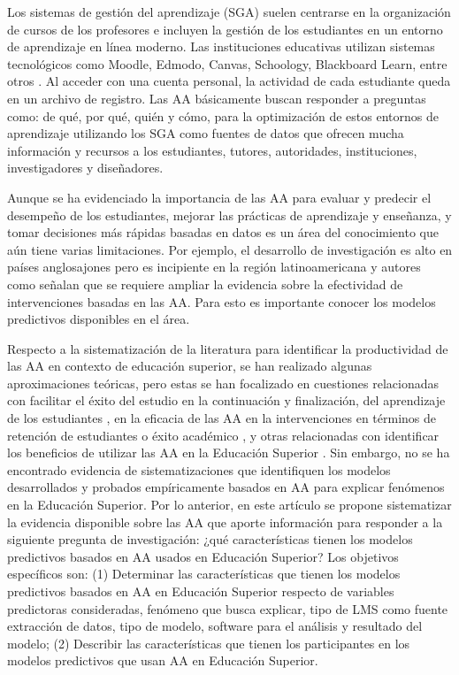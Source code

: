 \documentclass[spanish]{textolivre}
\begin{document}
Los sistemas de gestión del aprendizaje (SGA) suelen centrarse en la organización de cursos de los profesores e incluyen la gestión de los estudiantes en un entorno de aprendizaje en línea moderno. Las instituciones educativas utilizan sistemas tecnológicos como Moodle, Edmodo, Canvas, Schoology, Blackboard Learn, entre otros \cite{zhang2020}. Al acceder con una cuenta personal, la actividad de cada estudiante queda en un archivo de registro. Las AA básicamente buscan responder a preguntas como: de qué, por qué, quién y cómo, para la optimización de estos entornos de aprendizaje utilizando los SGA como fuentes de datos que ofrecen mucha información y recursos a los estudiantes, tutores, autoridades, instituciones, investigadores y diseñadores.

Aunque se ha evidenciado la importancia de las AA para evaluar y predecir el desempeño de los estudiantes, mejorar las prácticas de aprendizaje y enseñanza, y tomar decisiones más rápidas basadas en datos \cite{hooda2020} es un área del conocimiento que aún tiene varias limitaciones. Por ejemplo, el desarrollo de investigación es alto en países anglosajones pero es incipiente en la región latinoamericana \cite{cechinel2020} y autores como \textcite{ifenthaler2020b} señalan que se requiere ampliar la evidencia sobre la efectividad de intervenciones basadas en las AA. Para esto es importante conocer los modelos predictivos disponibles en el área.

Respecto a la sistematización de la literatura para identificar la productividad de las AA en contexto de educación superior, se han realizado algunas aproximaciones teóricas, pero estas se han focalizado en cuestiones relacionadas con facilitar el éxito del estudio en la continuación y finalización, del aprendizaje de los estudiantes \cite{ifenthaler2020a}, en la eficacia de las AA en la intervenciones en términos de retención de estudiantes o éxito académico \cite{larrabee2019}, y otras relacionadas con identificar los beneficios de utilizar las AA en la Educación Superior \cite{banihashem2018}.  Sin embargo, no se ha encontrado evidencia de sistematizaciones que identifiquen los modelos desarrollados y probados empíricamente basados en AA para explicar fenómenos en la Educación Superior. Por lo anterior, en este artículo se propone sistematizar la evidencia disponible sobre las AA que aporte información para responder a la siguiente pregunta de investigación: ¿qué características tienen los modelos predictivos basados en AA usados en Educación Superior? Los objetivos específicos son: (1) Determinar las características que tienen los modelos predictivos basados en AA en Educación Superior respecto de variables predictoras consideradas, fenómeno que busca explicar, tipo de LMS como fuente extracción de datos, tipo de modelo, software para el análisis y resultado del modelo; (2) Describir las características que tienen los participantes en los modelos predictivos que usan AA en Educación Superior.
\end{document}
